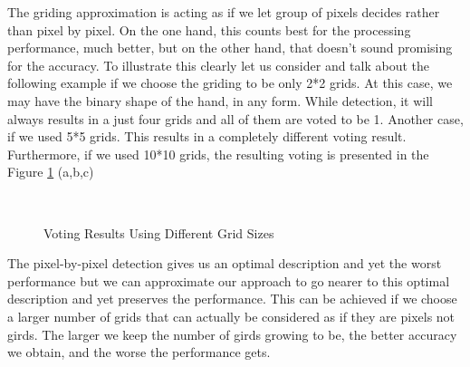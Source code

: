 The griding approximation is acting as if we let group of pixels decides rather than pixel by pixel. On the one hand, this counts best for the processing performance, much better, but on the other hand, that doesn't sound promising for the accuracy. To illustrate this clearly let us consider and talk about the following example if we choose the griding to be only 2*2 grids. At this case, we may have the binary shape of the hand, in any form. While detection, it will always results in a just four grids and all of them are voted to be 1. Another case, if we used 5*5 grids. This results in a completely different voting result. Furthermore, if we used 10*10 grids, the resulting voting is presented in the Figure \ref{fig:bin_sizes} (a,b,c)
\begin{figure}[h]
\begin{dBox}
\centering
  \mbox{
   }
   \caption{Voting Results Using Different Grid Sizes \label{fig:bin_sizes} }   
\end{dBox}   
\end{figure}
\bigskip

The pixel-by-pixel detection gives us an optimal description and yet the worst performance but we can approximate our approach to go nearer to this optimal description and yet preserves the performance. This can be achieved if we choose a larger number of grids that can actually be considered as if they are pixels not girds. The larger we keep the number of girds growing to be, the better accuracy we obtain, and the worse the performance gets.\bigskip

